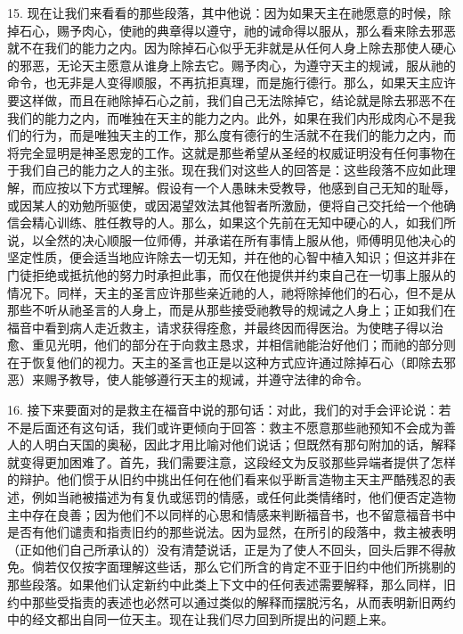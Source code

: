 15. 现在让我们来看看的那些段落，其中他说：因为如果天主在祂愿意的时候，除掉石心，赐予肉心，使祂的典章得以遵守，祂的诫命得以服从，那么看来除去邪恶就不在我们的能力之内。因为除掉石心似乎无非就是从任何人身上除去那使人硬心的邪恶，无论天主愿意从谁身上除去它。赐予肉心，为遵守天主的规诫，服从祂的命令，也无非是人变得顺服，不再抗拒真理，而是施行德行。那么，如果天主应许要这样做，而且在祂除掉石心之前，我们自己无法除掉它，结论就是除去邪恶不在我们的能力之内，而唯独在天主的能力之内。此外，如果在我们内形成肉心不是我们的行为，而是唯独天主的工作，那么度有德行的生活就不在我们的能力之内，而将完全显明是神圣恩宠的工作。这就是那些希望从圣经的权威证明没有任何事物在于我们自己的能力之人的主张。现在我们对这些人的回答是：这些段落不应如此理解，而应按以下方式理解。假设有一个人愚昧未受教导，他感到自己无知的耻辱，或因某人的劝勉所驱使，或因渴望效法其他智者所激励，便将自己交托给一个他确信会精心训练、胜任教导的人。那么，如果这个先前在无知中硬心的人，如我们所说，以全然的决心顺服一位师傅，并承诺在所有事情上服从他，师傅明见他决心的坚定性质，便会适当地应许除去一切无知，并在他的心智中植入知识；但这并非在门徒拒绝或抵抗他的努力时承担此事，而仅在他提供并约束自己在一切事上服从的情况下。同样，天主的圣言应许那些亲近祂的人，祂将除掉他们的石心，但不是从那些不听从祂圣言的人身上，而是从那些接受祂教导的规诫之人身上；正如我们在福音中看到病人走近救主，请求获得痊愈，并最终因而得医治。为使瞎子得以治愈、重见光明，他们的部分在于向救主恳求，并相信祂能治好他们；而祂的部分则在于恢复他们的视力。天主的圣言也正是以这种方式应许通过除掉石心（即除去邪恶）来赐予教导，使人能够遵行天主的规诫，并遵守法律的命令。\par

16. 接下来要面对的是救主在福音中说的那句话：对此，我们的对手会评论说：若不是后面还有这句话，我们或许更倾向于回答：救主不愿意那些祂预知不会成为善人的人明白天国的奥秘，因此才用比喻对他们说话；但既然有那句附加的话，解释就变得更加困难了。首先，我们需要注意，这段经文为反驳那些异端者提供了怎样的辩护。他们惯于从旧约中挑出任何在他们看来似乎断言造物主天主严酷残忍的表述，例如当祂被描述为有复仇或惩罚的情感，或任何此类情绪时，他们便否定造物主中存在良善；因为他们不以同样的心思和情感来判断福音书，也不留意福音书中是否有他们谴责和指责旧约的那些说法。因为显然，在所引的段落中，救主被表明（正如他们自己所承认的）没有清楚说话，正是为了使人不回头，回头后罪不得赦免。倘若仅仅按字面理解这些话，那么它们所含的肯定不亚于旧约中他们所挑剔的那些段落。如果他们认定新约中此类上下文中的任何表述需要解释，那么同样，旧约中那些受指责的表述也必然可以通过类似的解释而摆脱污名，从而表明新旧两约中的经文都出自同一位天主。现在让我们尽力回到所提出的问题上来。\par

